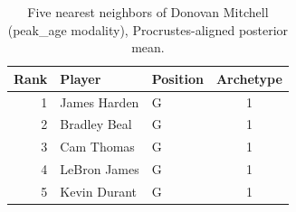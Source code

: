 \begin{table}[htbp]
  \centering\small
  \begin{tabular}{rllc}
    \toprule
    Rank & Player & Position & Archetype \\
    \midrule
    1 & James Harden & G & 1 \\
    2 & Bradley Beal & G & 1 \\
    3 & Cam Thomas & G & 1 \\
    4 & LeBron James & G & 1 \\
    5 & Kevin Durant & G & 1 \\
    \bottomrule
  \end{tabular}
  \caption{Five nearest neighbors of Donovan Mitchell (peak_age modality), Procrustes-aligned posterior mean.}
  \label{tab:Donovan_Mitchell_neighbors_peak_age}
\end{table}

